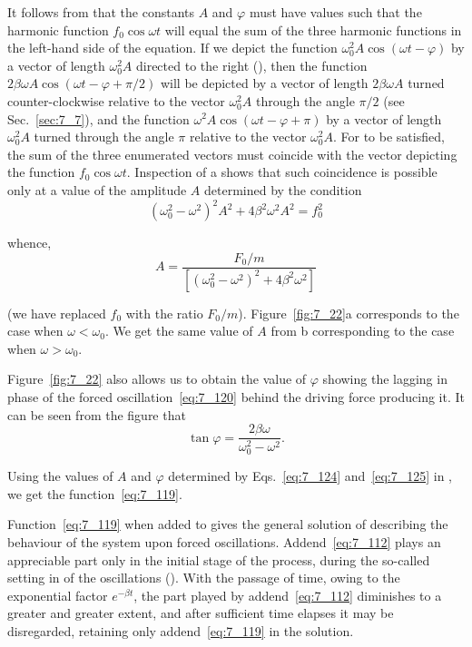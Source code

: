 It follows from  that the constants $A$ and $\varphi$ must have values such that the harmonic function $f_0\cos\omega t$ will equal the sum of the three harmonic functions in the left-hand side of the equation. If we depict the function $\omega_0^2A\cos(\omega t-\varphi)$ by a vector of length $\omega_0^2A$ directed to the right (), then the function $2\beta\omega A\cos(\omega t-\varphi+\pi/2)$ will be depicted by a vector of length $2\beta\omega A$ turned counter-clockwise relative to the vector $\omega_0^2A$ through the angle $\pi/2$ (see Sec.~\ref{sec:7_7}), and the function $\omega^2A\cos(\omega t-\varphi+\pi)$ by a vector of length $\omega_0^2A$ turned through the angle $\pi$ relative to the vector $\omega_0^2A$. For  to be satisfied, the sum of the three enumerated vectors must coincide with the vector depicting the function $f_0\cos\omega t$. Inspection of a shows that such coincidence is possible only at a value of the amplitude $A$ determined by the condition
\begin{equation*}
	\left(\omega_0^2 - \omega^2\right)^2A^2 + 4\beta^2\omega^2A^2 = f_0^2
\end{equation*}

\noindent
whence,
\begin{equation}\label{eq:7_124}
	A = \frac{F_0/m}{\left[\left(\omega_0^2 - \omega^2\right)^2 + 4\beta^2\omega^2\right]}
\end{equation}

\noindent
(we have replaced $f_0$ with the ratio $F_0/m$). Figure~\ref{fig:7_22}a corresponds to the case when $\omega<\omega_0$. We get the same value of $A$ from b corresponding to the case when $\omega>\omega_0$.

Figure~\ref{fig:7_22} also allows us to obtain the value of $\varphi$ showing the lagging in phase of the forced oscillation~\eqref{eq:7_120} behind the driving force producing it. It can be seen from the figure that
\begin{equation}\label{eq:7_125}
	\tan\varphi = \frac{2\beta\omega}{\omega_0^2 - \omega^2}.
\end{equation}

\noindent
Using the values of $A$ and $\varphi$ determined by Eqs.~\eqref{eq:7_124} and~\eqref{eq:7_125} in , we get the function~\eqref{eq:7_119}.

Function~\eqref{eq:7_119} when added to  gives the general solution of  describing the behaviour of the system upon forced oscillations. Addend~\eqref{eq:7_112} plays an appreciable part only in the initial stage of the process, during the so-called setting in of the oscillations (). With the passage of time, owing to the exponential factor $e^{-\beta t}$, the part played by addend~\eqref{eq:7_112} diminishes to a greater and greater extent, and after sufficient time elapses it may be disregarded, retaining only addend~\eqref{eq:7_119} in the solution.

